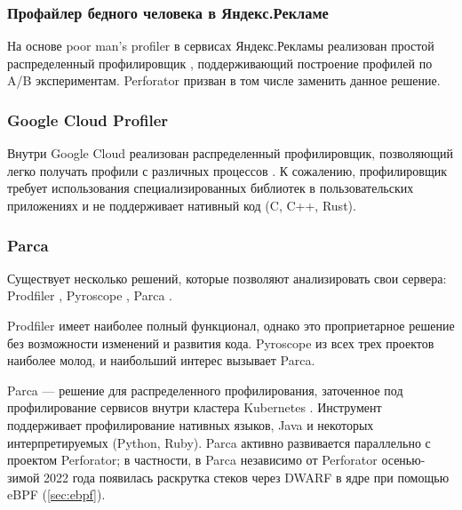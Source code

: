 \subsubsection{Профайлер бедного человека в Яндекс.Рекламе} \label{sec:yabs}
На основе poor man's profiler в сервисах Яндекс.Рекламы реализован простой распределенный профилировщик \cite{pmp:yabs}, поддерживающий
построение профилей по A/B экспериментам.
Perforator призван в том числе заменить данное решение.

\subsubsection{Google Cloud Profiler}
Внутри Google Cloud реализован распределенный профилировщик, позволяющий легко получать профили с различных процессов \cite{gcp}.
К сожалению, профилировщик требует использования специализированных библиотек в пользовательских приложениях
и не поддерживает нативный код (C, C++, Rust).

\subsubsection{Parca}
Существует несколько решений, которые позволяют анализировать свои сервера:
Prodfiler \cite{prodfiler}, Pyroscope \cite{pyroscope}, Parca \cite{parca}.

Prodfiler имеет наиболее полный функционал, однако это проприетарное решение без возможности изменений и развития кода.
Pyroscope из всех трех проектов наиболее молод, и наибольший интерес вызывает Parca.

Parca --- решение для распределенного профилирования, заточенное под профилирование сервисов внутри кластера Kubernetes \cite{kubernetes}.
Инструмент поддерживает профилирование нативных языков, Java и некоторых интерпретируемых (Python, Ruby).
Parca активно развивается параллельно с проектом Perforator;
в частности, в Parca независимо от Perforator осенью-зимой 2022 года
появилась раскрутка стеков через DWARF в ядре при помощью eBPF (\ref{sec:ebpf}).

